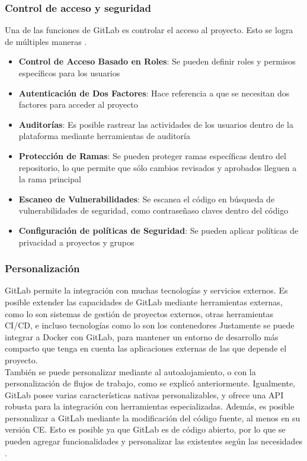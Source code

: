 \documentclass[runningheads]{llncs}
\begin{document}
\subsubsection{Control de acceso y seguridad}
Una de las funciones de GitLab es controlar el acceso al proyecto. Esto se logra de múltiples maneras \cite{safari2020structural}.
\begin{itemize}
        \item \textbf{Control de Acceso Basado en Roles}: Se pueden definir roles y permisos específicos para los usuarios
        \item \textbf{Autenticación de Dos Factores}: Hace referencia a que se necesitan dos factores para acceder al proyecto
        \item \textbf{Auditorías}: Es posible rastrear las actividades de los usuarios dentro de la plataforma mediante herramientas de auditoría
        \item \textbf{Protección de Ramas}: Se pueden proteger ramas específicas dentro del repositorio, lo que permite que sólo cambios revisados y aprobados lleguen a la rama principal
        \item \textbf{Escaneo de Vulnerabilidades}: Se escanea el código en búsqueda de vulnerabilidades de seguridad, como contraseñaso claves dentro del código
        \item \textbf{Configuración de políticas de Seguridad}: Se pueden aplicar políticas de privacidad a proyectos y grupos
\end{itemize}
\subsubsection{Personalización}
GitLab permite la integración con muchas tecnologías y servicios externos. Es posible extender las capacidades de GitLab mediante herramientas externas,
como lo son sistemas de gestión de proyectos externos, otras herramientas CI/CD, e incluso tecnologías como lo son los contenedores
Justamente se puede integrar a Docker con GitLab, para mantener un entorno de desarrollo más compacto que tenga en cuenta las aplicaciones
externas de las que depende el proyecto.\\
También se puede personalizar mediante al autoalojamiento, o con la personalización de flujos de trabajo, como se explicó anteriormente. Igualmente,
GitLab posee varias características nativas personalizables, y ofrece una API robusta para la integración con herramientas especializadas.
Además, es posible personalizar a GitLab mediante la modificación del código fuente, al menos en su versión CE. Esto es posible ya que GitLab
es de código abierto, por lo que se pueden agregar funcionalidades y personalizar las existentes según las necesidades \cite{safari2020structural}.
\end{document}
